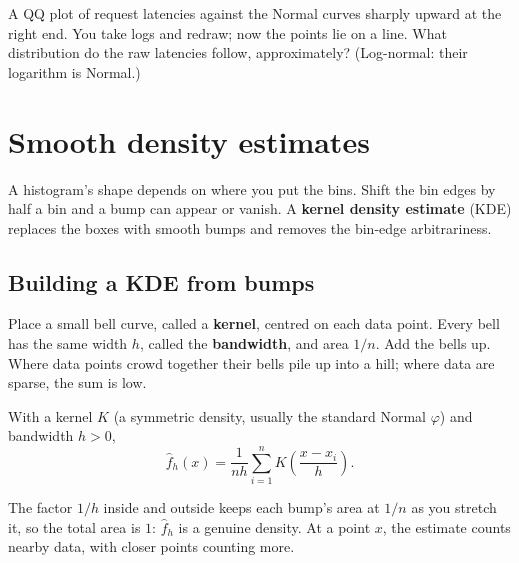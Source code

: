 \begin{recoverybox}
A QQ plot of request latencies against the Normal curves sharply upward at the right
end. You take logs and redraw; now the points lie on a line. What distribution do the
raw latencies follow, approximately? (Log-normal: their logarithm is Normal.)
\end{recoverybox}

\section{Smooth density estimates}

A histogram's shape depends on where you put the bins. Shift the bin edges by half a
bin and a bump can appear or vanish. A \textbf{kernel density estimate} (KDE) replaces
the boxes with smooth bumps and removes the bin-edge arbitrariness.

\subsection{Building a KDE from bumps}

Place a small bell curve, called a \textbf{kernel}, centred on each data point. Every
bell has the same width $h$, called the \textbf{bandwidth}, and area $1/n$. Add the
bells up. Where data points crowd together their bells pile up into a hill; where data
are sparse, the sum is low.

\begin{definition}
With a kernel $K$ (a symmetric density, usually the standard Normal $\varphi$) and
bandwidth $h > 0$,
\[
  \hat f_h(x) = \frac{1}{nh}\sum_{i=1}^n K\!\left(\frac{x - x_i}{h}\right).
\]
\end{definition}

The factor $1/h$ inside and outside keeps each bump's area at $1/n$ as you stretch it,
so the total area is $1$: $\hat f_h$ is a genuine density. At a point $x$, the estimate
counts nearby data, with closer points counting more.

